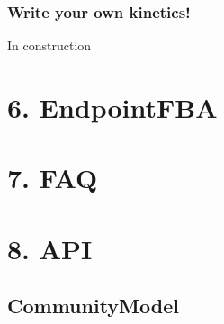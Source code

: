 \documentclass[letterpaper,10pt,english]{sphinxmanual}
\begin{document}
\subsection{Write your own kinetics!}
\label{\detokenize{5_djoint/home:write-your-own-kinetics}}
\sphinxAtStartPar
In construction

\sphinxstepscope


\chapter{6. EndpointFBA}
\label{\detokenize{6_endpoint_fba/home:endpointfba}}\label{\detokenize{6_endpoint_fba/home::doc}}
\sphinxstepscope


\chapter{7. FAQ}
\label{\detokenize{7_faq/home:faq}}\label{\detokenize{7_faq/home::doc}}
\sphinxstepscope


\chapter{8. API}
\label{\detokenize{8_API/endPointFBA:api}}\label{\detokenize{8_API/endPointFBA::doc}}

\section{CommunityModel}
\label{\detokenize{8_API/endPointFBA:module-endPointFBA.CommunityModel}}\label{\detokenize{8_API/endPointFBA:communitymodel}}
\end{document}
